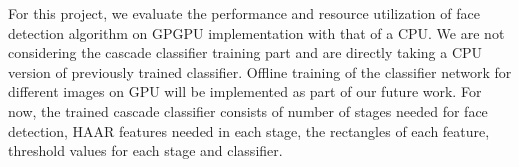 \begin{table*}[h]
    \centering
    \vspace{0.05in}
    \caption{Registers, Shared Memory, Constant Memory and Occupancy for all the kernels}
    \label{table:util}
\end{table*}




For this project, we evaluate the performance and resource utilization 
of face detection algorithm on GPGPU implementation with that of a CPU. 
We are not considering the
cascade classifier training part and are directly taking a CPU version of
previously trained classifier. Offline training of the classifier network
for different images on GPU will be implemented as part of our future work.
For now, the trained cascade classifier consists of 
number of stages needed for face detection, HAAR features needed in each
stage, the rectangles of each feature, threshold values for each stage and classifier.

